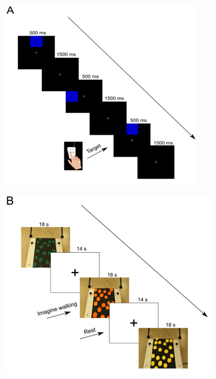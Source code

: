 \documentclass[a4paper,fleqn]{cas-sc}
\begin{document}
\begin{figure}[ht]
    \centering
    \begin{minipage}{0.4\textwidth}
        \centering
        \includegraphics[clip, trim=0 0 0 15, width=\linewidth]{figs/nback.png} %
         \label{fig:a}
    \end{minipage}
    \hspace{0.1\textwidth}
    \begin{minipage}{0.4\textwidth}
        \centering
        \includegraphics[clip, trim=0 0 0 15, width=\linewidth]{figs/imagery.png} %

\end{minipage}
\end{figure}
\end{document}
